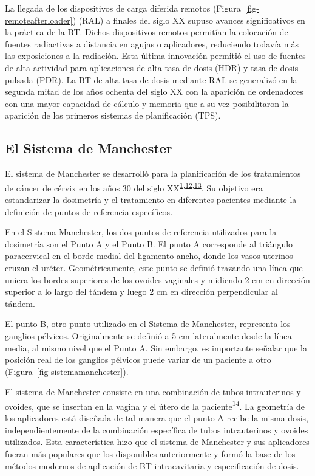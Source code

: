 \documentclass[
  a4paper,
]{scrreprt}
\begin{document}
La llegada de los dispositivos de carga diferida remotos
(Figura~\ref{fig-remoteafterloader}) (RAL) a finales del siglo XX supuso
avances significativos en la práctica de la BT. Dichos dispositivos
remotos permitían la colocación de fuentes radiactivas a distancia en
agujas o aplicadores, reduciendo todavía más las exposiciones a la
radiación. Esta última innovación permitió el uso de fuentes de alta
actividad para aplicaciones de alta tasa de dosis (HDR) y tasa de dosis
pulsada (PDR). La BT de alta tasa de dosis mediante RAL se generalizó en
la segunda mitad de los años ochenta del siglo XX con la aparición de
ordenadores con una mayor capacidad de cálculo y memoria que a su vez
posibilitaron la aparición de los primeros sistemas de planificación
(TPS).

\hypertarget{el-sistema-de-manchester}{%
\subsection{El Sistema de Manchester}\label{el-sistema-de-manchester}}

El sistema de Manchester se desarrolló para la planificación de los
tratamientos de cáncer de cérvix en los años 30 del siglo
XX\textsuperscript{\protect\hyperlink{ref-goodwin1968}{1},\protect\hyperlink{ref-tod1938}{12},\protect\hyperlink{ref-tod1953}{13}}.
Su objetivo era estandarizar la dosimetría y el tratamiento en
diferentes pacientes mediante la definición de puntos de referencia
específicos.

En el Sistema Manchester, los dos puntos de referencia utilizados para
la dosimetría son el Punto A y el Punto B. El punto A corresponde al
triángulo paracervical en el borde medial del ligamento ancho, donde los
vasos uterinos cruzan el uréter. Geométricamente, este punto se definió
trazando una línea que uniera los bordes superiores de los ovoides
vaginales y midiendo 2 cm en dirección superior a lo largo del tándem y
luego 2 cm en dirección perpendicular al tándem.

El punto B, otro punto utilizado en el Sistema de Manchester, representa
los ganglios pélvicos. Originalmente se definió a 5 cm lateralmente
desde la línea media, al mismo nivel que el Punto A. Sin embargo, es
importante señalar que la posición real de los ganglios pélvicos puede
variar de un paciente a otro (Figura~\ref{fig-sistemamanchester}).

El sistema de Manchester consiste en una combinación de tubos
intrauterinos y ovoides, que se insertan en la vagina y el útero de la
paciente\textsuperscript{\protect\hyperlink{ref-yordy2012}{14}}. La
geometría de los aplicadores está diseñada de tal manera que el punto A
recibe la misma dosis, independientemente de la combinación específica
de tubos intrauterinos y ovoides utilizados. Esta característica hizo
que el sistema de Manchester y sus aplicadores fueran más populares que
los disponibles anteriormente y formó la base de los métodos modernos de
aplicación de BT intracavitaria y especificación de dosis.
\end{document}
